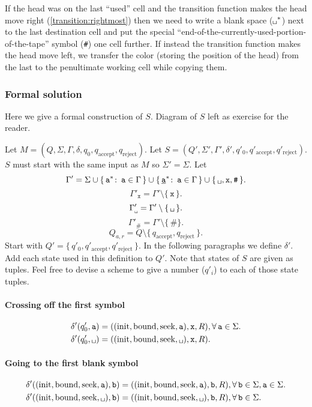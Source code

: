 \documentclass{article}
\newcommand{\obullet}[1]{\ensuremath{#1^*}}
\newcommand{\0}{\texttt{\textvisiblespace}}
\newcommand{\°}{\obullet{\0}}
\newcommand{\A}{\obullet{\s}}
\newcommand{\HA}{\obullet{\underline{\s}}}
\newcommand{\s}{\texttt{a}}
\newcommand{\w}{\texttt{b}}
\newcommand{\X}{\texttt{x}}
\newcommand{\e}{\texttt{\#}}
\newcommand{\st}{\colon\,}
\newcommand{\qa}{q_\text{accept}}
\newcommand{\qr}{q_\text{reject}}
\newcommand{\qpz}{q'_0}
\newcommand{\qpa}{q'_\text{accept}}
\newcommand{\qpr}{q'_\text{reject}}
\newcommand{\gpwb}{\Gamma'_{\0{}}}
\newcommand{\gpwx}{\Gamma'_{\X{}}}
\newcommand{\gpwe}{\Gamma'_{\e{}}}
\newcommand{\qwar}{Q_{a,r}}
\begin{document}
If the head was on the last ``used'' cell and the transition function makes
the head move right (\ref{transition:rightmost}) then we need to write a blank space (\°{}) next to the
last destination
cell and put the special
``end-of-the-currently-used-portion-of-the-tape'' symbol (\e)
one cell further. If instead the transition function makes the head move left,
we transfer the color (storing the position of the head) from the last
to the penultimate working cell while copying them.

\subsubsection{Formal solution}
Here we give a formal construction of $S$.
Diagram of $S$ left as exercise for the reader.

Let $M=(Q,\Sigma,\Gamma,\delta,q_0,q_{\text{accept}},q_{\text{reject}})$.
Let $S=(Q',\Sigma',\Gamma',\delta',\qpz,\qpa,\qpr)$.
$S$ must start with the same input as $M$ so $\Sigma'=\Sigma$. Let
$$\Gamma' = \Sigma \cup \{\,\A \st \s \in \Gamma\,\} \cup
\{\,\HA \st \s \in \Gamma\,\} \cup \{\,\0{}, \X, \e\,\}.$$
$$\gpwx = \Gamma' \setminus\{\,\X\,\}.$$
$$\gpwb = \Gamma' \setminus\{\,\0{}\,\}.$$
$$\gpwe = \Gamma' \setminus\{\,\e\}.$$
$$\qwar = Q\setminus\{\,\qa,\qr\,\}.$$
Start with $Q' = \{\,\qpz,\qpa,\qpr\,\}$. In the following paragraphs we define
$\delta'$. Add each state used in this definition to $Q'$.
Note that states of $S$ are given as tuples. Feel free to devise a scheme to
give a number ($q'_i$) to each of those state tuples.

\paragraph{Crossing off the first symbol}
\begin{align}
  \delta'(\qpz,\s)
  &= ((\text{init},\text{bound}, \text{seek}, \s), \X, R),
  \forall\, \s \in \Sigma.\\
  \delta'(\qpz,\0{})
  &= ((\text{init},\text{bound}, \text{seek}, \0{}), \X, R).
\end{align}

\paragraph{Going to the first blank symbol}
\begin{align}
  \delta'((\text{init},\text{bound}, \text{seek}, \s), \w)
  &= ((\text{init},\text{bound}, \text{seek}, \s), \w, R),
  \forall\,
  \w \in \Sigma,
  \s \in \Sigma.\\
  \delta'((\text{init},\text{bound}, \text{seek}, \0{}), \w)
  &= ((\text{init},\text{bound}, \text{seek}, \0{}), \w, R),
  \forall\, \w \in \Sigma.
\end{align}
\end{document}
